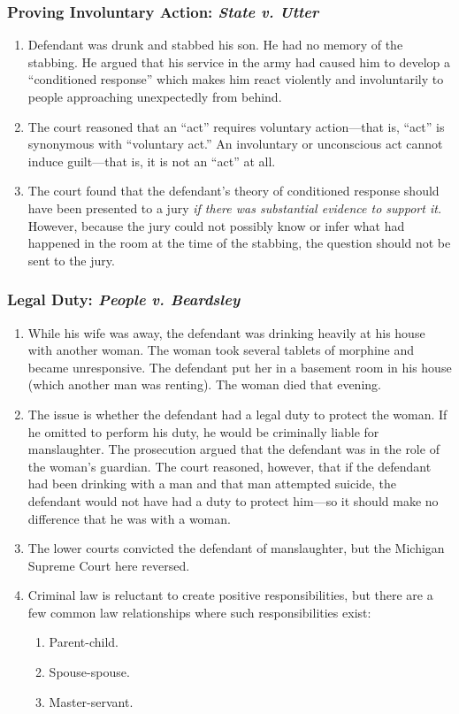 \subsubsection{Proving Involuntary Action: \emph{State v. Utter}}

\begin{enumerate}
    \item Defendant was drunk and stabbed his son. He had no memory of the stabbing. He argued that his service in the army had caused him to develop a ``conditioned response'' which makes him react violently and involuntarily to people approaching unexpectedly from behind.
    \item The court reasoned that an ``act'' requires voluntary action---that is, ``act'' is synonymous with ``voluntary act.'' An involuntary or unconscious act cannot induce guilt---that is, it is not an ``act'' at all.
    \item The court found that the defendant's theory of conditioned response should have been presented to a jury \emph{if there was substantial evidence to support it.} However, because the jury could not possibly know or infer what had happened in the room at the time of the stabbing, the question should not be sent to the jury.
\end{enumerate}

\subsubsection{Legal Duty: \emph{People v. Beardsley}}

\begin{enumerate}
    \item While his wife was away, the defendant was drinking heavily at his house with another woman. The woman took several tablets of morphine and became unresponsive. The defendant put her in a basement room in his house (which another man was renting). The woman died that evening.
    \item The issue is whether the defendant had a legal duty to protect the woman. If he omitted to perform his duty, he would be criminally liable for manslaughter. The prosecution argued that the defendant was in the role of the woman's guardian. The court reasoned, however, that if the defendant had been drinking with a man and that man attempted suicide, the defendant would not have had a duty to protect him---so it should make no difference that he was with a woman.
    \item The lower courts convicted the defendant of manslaughter, but the Michigan Supreme Court here reversed.
    \item Criminal law is reluctant to create positive responsibilities, but there are a few common law relationships where such responsibilities exist:
    \begin{enumerate}
        \item Parent-child.
        \item Spouse-spouse.
        \item Master-servant.
    \end{enumerate}
\end{enumerate}

